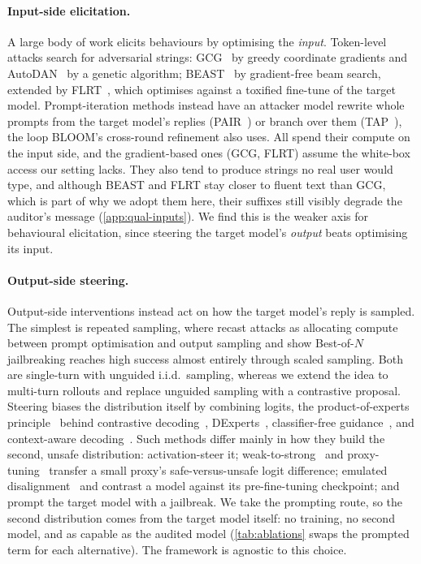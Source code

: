 \documentclass{article}
\theoremstyle{plain}
\theoremstyle{definition}
\theoremstyle{remark}
\begin{document}
\paragraph{Input-side elicitation.}
A large body of work elicits behaviours by optimising the \emph{input}.
Token-level attacks search for adversarial strings: GCG~\citep{zou2023universal} by greedy coordinate gradients and AutoDAN~\citep{liu2023autodan} by a genetic algorithm; BEAST~\citep{sadasivan2024fast} by gradient-free beam search, extended by FLRT~\citep{thompson2024flrt}, which optimises against a toxified fine-tune of the target model.
Prompt-iteration methods instead have an attacker model rewrite whole prompts from the target model's replies (PAIR~\citep{chao2023jailbreaking}) or branch over them (TAP~\citep{mehrotra2023tap}), the loop BLOOM's cross-round refinement also uses.
All spend their compute on the input side, and the gradient-based ones (GCG, FLRT) assume the white-box access our setting lacks.
They also tend to produce strings no real user would type, and although BEAST and FLRT stay closer to fluent text than GCG, which is part of why we adopt them here, their suffixes still visibly degrade the auditor's message (\cref{app:qual-inputs}).
We find this is the weaker axis for behavioural elicitation, since steering the target model's \emph{output} beats optimising its input.


\paragraph{Output-side steering.}
Output-side interventions instead act on how the target model's reply is sampled.
The simplest is repeated sampling, where \citet{beyer2026sampling} recast attacks as allocating compute between prompt optimisation and output sampling and \citet{hughes2024bon} show Best-of-$N$ jailbreaking reaches high success almost entirely through scaled sampling.
Both are single-turn with unguided i.i.d.\ sampling, whereas we extend the idea to multi-turn rollouts and replace unguided sampling with a contrastive proposal.
Steering biases the distribution itself by combining logits, the product-of-experts principle~\citep{hinton2002poe} behind contrastive decoding~\citep{li2023contrastive}, DExperts~\citep{liu2021dexperts}, classifier-free guidance~\citep{ho2022cfg,sanchez2023cfg}, and context-aware decoding~\citep{shi2024trusting}.
Such methods differ mainly in how they build the second, unsafe distribution: \citet{angell2026tail} activation-steer it; weak-to-strong~\citep{zhao2024weak} and proxy-tuning~\citep{liu2024proxy} transfer a small proxy's safe-versus-unsafe logit difference; emulated disalignment~\citep{zhou2024emulated} and \citet{aranguri2025diffamp} contrast a model against its pre-fine-tuning checkpoint; and \citet{chowdhury2025pathological} prompt the target model with a jailbreak.
We take the prompting route, so the second distribution comes from the target model itself: no training, no second model, and as capable as the audited model (\cref{tab:ablations} swaps the prompted term for each alternative).
The framework is agnostic to this choice.
\end{document}
